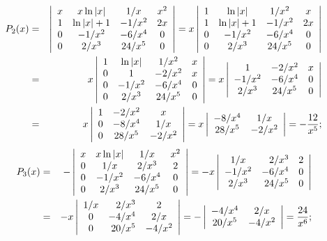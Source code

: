 \documentclass[dvips]{book}
\numberwithin{example}{section}
\numberwithin{equation}{section}
\numberwithin{theorem}{section}
\numberwithin{table}{section}
\numberwithin{figure}{section}
\begin{document}
\begin{eqnarray*}
P_2(x)&=&
\left|\begin{array}{cccc}
x&x\ln|x|&1/x&x^2\\
1&\ln|x|+1&-1/x^2&2x\\
0&-1/x^2&-6/x^4&0\\
0&2/x^3&24/x^5&0
\end{array}\right|=
x\left|\begin{array}{cccc}
1&\ln|x|&1/x^2&x\\
1&\ln|x|+1&-1/x^2&2x\\
0&-1/x^2&-6/x^4&0\\
0&2/x^3&24/x^5&0
\end{array}\right|\\
&=&x\left|\begin{array}{cccc}
1&\ln|x|&1/x^2&x\\
0&1&-2/x^2&x\\
0&-1/x^2&-6/x^4&0\\
0&2/x^3&24/x^5&0
\end{array}\right|=
x\left|\begin{array}{cccc}
1&-2/x^2&x\\
-1/x^2&-6/x^4&0\\
2/x^3&24/x^5&0
\end{array}\right|\\
&=&x\left|\begin{array}{cccc}
1&-2/x^2&x\\
0&-8/x^4&1/x\\
0&28/x^5&-2/x^2
\end{array}\right|=
x\left|\begin{array}{cccc}
-8/x^4&1/x\\
28/x^5&-2/x^2
\end{array}\right|=-{12\over x^5};
\end{eqnarray*}
\begin{eqnarray*}
P_3(x)&=&
-\left|\begin{array}{cccc}
x&x\ln|x|&1/x&x^2\\
0&1/x&2/x^3&2\\
0&-1/x^2&-6/x^4&0\\
0&2/x^3&24/x^5&0
\end{array}\right|=
-x\left|\begin{array}{crcc}
1/x&2/x^3&2\\
-1/x^2&-6/x^4&0\\
2/x^3&24/x^5&0
\end{array}\right|\\
&=&-x\left|\begin{array}{crcc}
1/x&2/x^3&2\\
0&-4/x^4&2/x\\
0&20/x^5&-4/x^2
\end{array}\right|=
-\left|\begin{array}{cccc}
-4/x^4&2/x\\
20/x^5&-4/x^2
\end{array}\right|=
{24\over x^6};
\end{eqnarray*}
\end{document}
